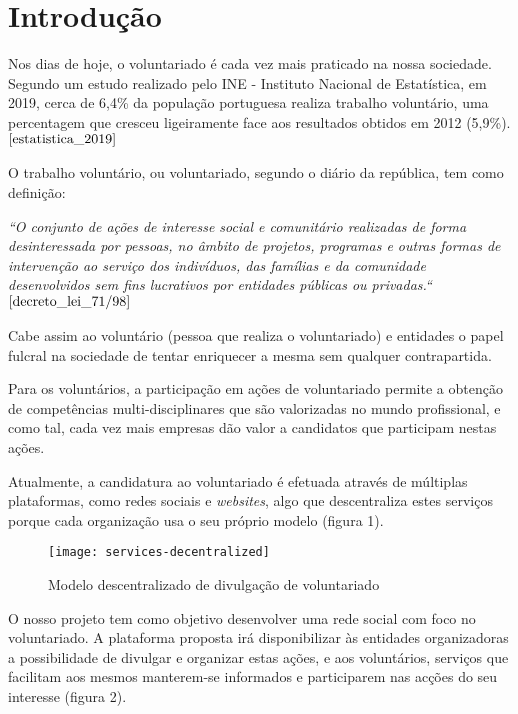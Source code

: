 \section{Introdução} \bigskip
Nos dias de hoje, o voluntariado é cada vez mais praticado na nossa sociedade. Segundo um estudo realizado pelo INE - Instituto Nacional de Estatística, em 2019, cerca de 6,4\% da população portuguesa realiza trabalho voluntário, uma percentagem que cresceu ligeiramente face aos resultados obtidos em 2012 (5,9\%).$^{\cite{estatistica_2019}}$
\par \bigskip

O trabalho voluntário, ou voluntariado, segundo o diário da república, tem como definição: \par \bigskip

\textit{
	``O conjunto de ações de interesse social e comunitário realizadas de forma desinteressada por pessoas, no âmbito de projetos, programas e outras formas de intervenção ao serviço dos indivíduos, das famílias e da comunidade desenvolvidos sem fins lucrativos por entidades públicas ou privadas.``
}$^{\cite{decreto_lei_71/98}}$ \par \bigskip

Cabe assim ao voluntário (pessoa que realiza o voluntariado) e entidades o papel fulcral na sociedade de tentar enriquecer a mesma sem qualquer contrapartida. \par \bigskip

Para os voluntários, a participação em ações de voluntariado permite a obtenção de competências multi-disciplinares que são valorizadas no mundo profissional, e como tal, cada vez mais empresas dão valor a candidatos que participam nestas ações. \par \bigskip

Atualmente, a candidatura ao voluntariado é efetuada através de múltiplas plataformas, como redes sociais e \textit{websites}, algo que descentraliza estes serviços porque cada organização usa o seu próprio modelo (figura 1).

\bigskip

\begin{figure}[h]
	\centering
	\texttt{[image: services-decentralized]}
	\caption{Modelo descentralizado de divulgação de voluntariado}	
\end{figure}

\newpage

O nosso projeto tem como objetivo desenvolver uma rede social  com foco no voluntariado. A plataforma proposta irá disponibilizar às entidades organizadoras a possibilidade de divulgar e organizar estas ações, e aos voluntários, serviços que facilitam aos mesmos manterem-se informados e participarem nas acções do seu interesse (figura 2).

